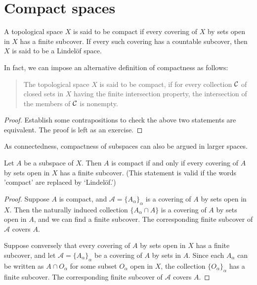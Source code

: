 \section{Compact spaces}

\begin{defi}
    A topological space $X$ is said to be compact if every covering of $X$ by sets open in $X$ has a finite subcover.
    If every such covering has a countable subcover, then $X$ is said to be a Lindel\"{o}f space.
\end{defi}
\begin{rmk}
    In fact, we can impose an alternative definition of compactness as follows:
    \begin{quotation}
        The topological space $X$ is said to be compact, if for every collection ${\mathcal{C}}$ of closed sets in $X$ having the finite intersection property, the intersection of the members of ${\mathcal{C}}$ is nonempty. 
    \end{quotation}
\end{rmk}
\begin{proof}
    Establish some contrapositions to check the above two statements are equivalent.
    The proof is left as an exercise.
\end{proof}

As connectedness, compactness of subspaces can also be argued in larger spaces.
\begin{thm}
    Let $A$ be a subspace of $X$.
    Then $A$ is compact if and only if every covering of $A$ by sets open in $X$ has a finite subcover.
    (This statement is valid if the words 'compact' are replaced by `Lindel\"{o}f.')
\end{thm}
\begin{proof}
    Suppose $A$ is compact, and $\mathcal{A}=\{A_\alpha\}_\alpha$ is a covering of $A$ by sets open in $X$.
    Then the naturally induced collection $\{A_\alpha\cap A\}$ is a covering of $A$ by sets open in $A$, and we can find a finite subcover.
    The corresponding finite subcover of $\mathcal{A}$ covers $A$.

    Suppose conversely that every covering of $A$ by sets open in $X$ has a finite subcover, and let $\mathcal{A}=\{A_\alpha\}_\alpha$ be a covering of $A$ by sets in $A$.
    Since each $A_\alpha$ can be written as $A\cap O_\alpha$ for some subset $O_\alpha$ open in $X$, the collection $\{O_\alpha\}_\alpha$ has a finite subcover.
    The corresponding finite subcover of $\mathcal{A}$ covers $A$.
\end{proof}

